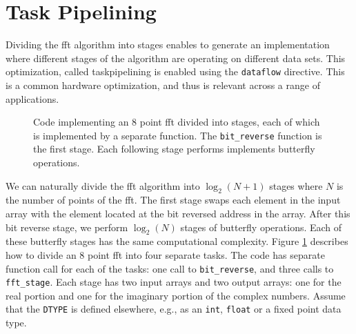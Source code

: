 \section{Task Pipelining}
\label{sec:fft_task_pipelining}

Dividing the \gls{fft} algorithm into stages enables \VHLS to generate an implementation where different stages of the algorithm are operating on different data sets. This optimization, called \gls{taskpipelining} is enabled using the \lstinline{dataflow} directive. This is a common hardware optimization, and thus is relevant across a range of applications.

\begin{figure}

\caption{Code implementing an 8 point \gls{fft} divided into stages, each of which is implemented by a separate function. The \lstinline{bit_reverse} function is the first stage. Each following stage performs implements butterfly operations. }
\label{fig:fft_stages_code}
\end{figure}

We can naturally divide the \gls{fft} algorithm into $\log_2(N+1)$ stages where $N$ is the number of points of the \gls{fft}.  The first stage swaps each element in the input array with the element located at the bit reversed address in the array. After this bit reverse stage, we perform $\log_2(N)$ stages of butterfly operations. Each of these butterfly stages has the same computational complexity.  Figure \ref{fig:fft_stages_code} describes how to divide an 8 point \gls{fft} into four separate tasks. The code has separate function call for each of the tasks: one call to \lstinline{bit_reverse}, and three calls to \lstinline{fft_stage}. Each stage has two input arrays and two output arrays: one for the real portion and one for the imaginary portion of the complex numbers. Assume that the \lstinline{DTYPE} is defined elsewhere, e.g., as an \lstinline{int}, \lstinline{float} or a fixed point data type.

